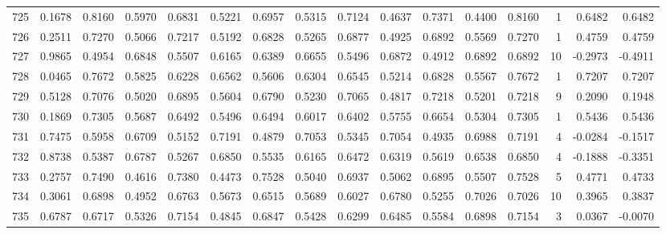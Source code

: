 \begin{tabular}{lrrrrrrrrrrrrrrr}
725 &      0.1678 &  0.8160 &  0.5970 &  0.6831 &  0.5221 &  0.6957 &  0.5315 &  0.7124 &  0.4637 &  0.7371 &   0.4400 &     0.8160 &      1 &                    0.6482 &                     0.6482 \\
726 &      0.2511 &  0.7270 &  0.5066 &  0.7217 &  0.5192 &  0.6828 &  0.5265 &  0.6877 &  0.4925 &  0.6892 &   0.5569 &     0.7270 &      1 &                    0.4759 &                     0.4759 \\
727 &      0.9865 &  0.4954 &  0.6848 &  0.5507 &  0.6165 &  0.6389 &  0.6655 &  0.5496 &  0.6872 &  0.4912 &   0.6892 &     0.6892 &     10 &                   -0.2973 &                    -0.4911 \\
728 &      0.0465 &  0.7672 &  0.5825 &  0.6228 &  0.6562 &  0.5606 &  0.6304 &  0.6545 &  0.5214 &  0.6828 &   0.5567 &     0.7672 &      1 &                    0.7207 &                     0.7207 \\
729 &      0.5128 &  0.7076 &  0.5020 &  0.6895 &  0.5604 &  0.6790 &  0.5230 &  0.7065 &  0.4817 &  0.7218 &   0.5201 &     0.7218 &      9 &                    0.2090 &                     0.1948 \\
730 &      0.1869 &  0.7305 &  0.5687 &  0.6492 &  0.5496 &  0.6494 &  0.6017 &  0.6402 &  0.5755 &  0.6654 &   0.5304 &     0.7305 &      1 &                    0.5436 &                     0.5436 \\
731 &      0.7475 &  0.5958 &  0.6709 &  0.5152 &  0.7191 &  0.4879 &  0.7053 &  0.5345 &  0.7054 &  0.4935 &   0.6988 &     0.7191 &      4 &                   -0.0284 &                    -0.1517 \\
732 &      0.8738 &  0.5387 &  0.6787 &  0.5267 &  0.6850 &  0.5535 &  0.6165 &  0.6472 &  0.6319 &  0.5619 &   0.6538 &     0.6850 &      4 &                   -0.1888 &                    -0.3351 \\
733 &      0.2757 &  0.7490 &  0.4616 &  0.7380 &  0.4473 &  0.7528 &  0.5040 &  0.6937 &  0.5062 &  0.6895 &   0.5507 &     0.7528 &      5 &                    0.4771 &                     0.4733 \\
734 &      0.3061 &  0.6898 &  0.4952 &  0.6763 &  0.5673 &  0.6515 &  0.5689 &  0.6027 &  0.6780 &  0.5255 &   0.7026 &     0.7026 &     10 &                    0.3965 &                     0.3837 \\
735 &      0.6787 &  0.6717 &  0.5326 &  0.7154 &  0.4845 &  0.6847 &  0.5428 &  0.6299 &  0.6485 &  0.5584 &   0.6898 &     0.7154 &      3 &                    0.0367 &                    -0.0070 \\

\end{tabular}
